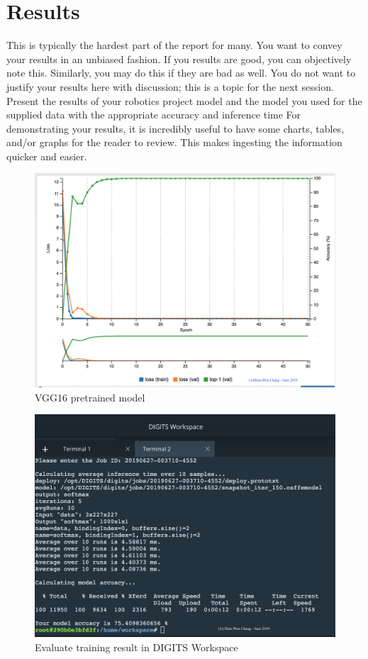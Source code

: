 \documentclass[10pt,journal,compsoc]{IEEEtran}
\begin{document}
\section{Results}
This is typically the hardest part of the report for many. You want to convey your results in an unbiased fashion. If you results are good, you can objectively note this. Similarly, you may do this if they are bad as well. You do not want to justify your results here with discussion; this is a topic for the next session. 
Present the results of your robotics project model and the model you used for the supplied data with the appropriate accuracy and inference time
For demonstrating your results, it is incredibly useful to have some charts, tables, and/or graphs for the reader to review. This makes ingesting the information quicker and easier.
\begin{figure}[thpb]
      \centering
      \includegraphics[width=\linewidth]{VGG16AcurracyLoss.png}
      \caption{VGG16 pretrained model}
      \label{fig:robot1}
\end{figure}

\begin{figure}[thpb]
      \centering
      \includegraphics[width=\linewidth]{evaluate.png}
      \caption{Evaluate training result in DIGITS Workspace}
      \label{fig:robot1}
\end{figure}
\end{document}
